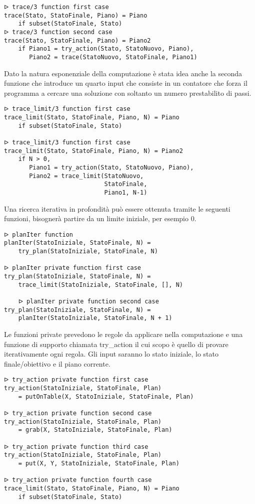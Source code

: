 \documentclass[12pt,twoside]{report}
\begin{document}
\begin{lstlisting}
ᐅ trace/3 function first case
trace(Stato, StatoFinale, Piano) = Piano
    if subset(StatoFinale, Stato)
ᐅ trace/3 function second case
trace(Stato, StatoFinale, Piano) = Piano2
    if Piano1 = try_action(Stato, StatoNuovo, Piano),
       Piano2 = trace(StatoNuovo, StatoFinale, Piano1)
\end{lstlisting}

Dato la natura esponenziale della computazione è stata idea anche la seconda funzione che introduce un quarto input che consiste in un contatore che forza il programma a cercare una soluzione con soltanto un numero prestabilito di passi.

\begin{lstlisting}
ᐅ trace_limit/3 function first case
trace_limit(Stato, StatoFinale, Piano, N) = Piano
    if subset(StatoFinale, Stato)

ᐅ trace_limit/3 function first case
trace_limit(Stato, StatoFinale, Piano, N) = Piano2
    if N > 0,
       Piano1 = try_action(Stato, StatoNuovo, Piano),
       Piano2 = trace_limit(StatoNuovo,
                            StatoFinale, 
                            Piano1, N-1)
\end{lstlisting}

Una ricerca iterativa in profondità può essere ottenuta tramite le seguenti funzioni, bisognerà partire da un limite iniziale, per esempio 0.

\begin{lstlisting}
ᐅ planIter function
planIter(StatoIniziale, StatoFinale, N) =
    try_plan(StatoIniziale, StatoFinale, N)

ᐅ planIter private function first case
try_plan(StatoIniziale, StatoFinale, N) =
    trace_limit(StatoIniziale, StatoFinale, [], N)

    ᐅ planIter private function second case
try_plan(StatoIniziale, StatoFinale, N) =
    planIter(StatoIniziale, StatoFinale, N + 1)
\end{lstlisting}

Le funzioni private prevedono le regole da applicare nella computazione e una funzione di supporto chiamata try\_action il cui scopo è quello di provare iterativamente ogni regola. Gli input saranno lo stato iniziale, lo stato finale/obiettivo e il piano corrente.

\begin{lstlisting}
ᐅ try_action private function first case
try_action(StatoIniziale, StatoFinale, Plan)
    = putOnTable(X, StatoIniziale, StatoFinale, Plan)
    
ᐅ try_action private function second case
try_action(StatoIniziale, StatoFinale, Plan)
    = grab(X, StatoIniziale, StatoFinale, Plan)
    
ᐅ try_action private function third case
try_action(StatoIniziale, StatoFinale, Plan)
    = put(X, Y, StatoIniziale, StatoFinale, Plan)
    
ᐅ try_action private function fourth case
trace_limit(Stato, StatoFinale, Piano, N) = Piano
    if subset(StatoFinale, Stato)
\end{lstlisting}
\end{document}
